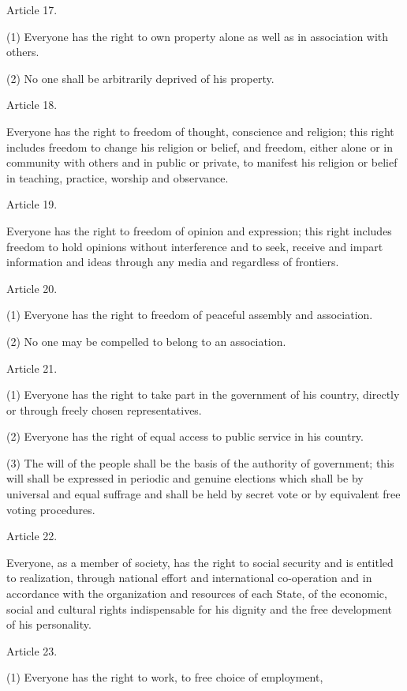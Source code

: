 \documentclass[11pt,a4paper]{article}
\begin{document}
Article 17.

(1) Everyone has the right to own property alone as well as in association with others.

(2) No one shall be arbitrarily deprived of his property.

Article 18.

Everyone has the right to freedom of thought, conscience and religion; this right includes freedom to change his religion or belief, and freedom, either alone or in community with others and in public or private, to manifest his religion or belief in teaching, practice, worship and observance.

Article 19.

Everyone has the right to freedom of opinion and expression; this right includes freedom to hold opinions without interference and to seek, receive and impart information and ideas through any media and regardless of frontiers.

Article 20.

(1) Everyone has the right to freedom of peaceful assembly and association.

(2) No one may be compelled to belong to an association.

Article 21.

(1) Everyone has the right to take part in the government of his country, directly or through freely chosen representatives.

(2) Everyone has the right of equal access to public service in his country.

(3) The will of the people shall be the basis of the authority of government; this will shall be expressed in periodic and genuine elections which shall be by universal and equal suffrage and shall be held by secret vote or by equivalent free voting procedures.

Article 22.

Everyone, as a member of society, has the right to social security and is entitled to realization, through national effort and international co-operation and in accordance with the organization and resources of each State, of the economic, social and cultural rights indispensable for his dignity and the free development of his personality.

Article 23.

(1) Everyone has the right to work, to free choice of employment,
\end{document}

